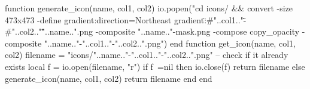 




\begin{luacode*}
    function generate_icon(name, col1, col2)
        io.popen("cd icons/ && convert -size 473x473 -define gradient:direction=Northeast gradient:\"#"..col1.."\"-\"#"..col2.."\" "..name..".png -composite "..name.."-mask.png -compose copy_opacity -composite "..name.."-"..col1.."-"..col2..".png")
    end
    function get_icon(name, col1, col2)
        filename = "icons/"..name.."-"..col1.."-"..col2..".png"
        -- check if it already exists
        local f = io.open(filename, "r")
        if f~=nil then 
            io.close(f) 
            return filename
        else 
            generate_icon(name, col1, col2)
            return filename  
        end
    end
\end{luacode*}
\newcommand{\geticon}[3]{\directlua{tex.print(get_icon(\luastring{#1}, \luastring{#2}, \luastring{#3}))}}

